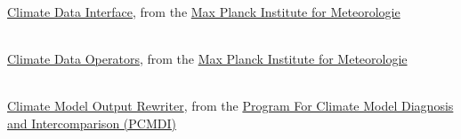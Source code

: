\begin{thebibliography}{xx}


 \ \\
  \href{https://code.mpimet.mpg.de/projects/cdi}
       {Climate Data Interface},
  from the
  \href{http://www.mpimet.mpg.de}
       {Max Planck Institute for Meteorologie}


 \ \\
  \href{https://code.mpimet.mpg.de/projects/cdo}
       {Climate Data Operators},
  from the
  \href{http://www.mpimet.mpg.de}
       {Max Planck Institute for Meteorologie}


 \ \\
  \href{http://cmor.llnl.gov}
       {Climate Model Output Rewriter},
  from the
  \href{https://www-pcmdi.llnl.gov}
       { Program For Climate Model Diagnosis and Intercomparison (PCMDI)}


\end{thebibliography}
